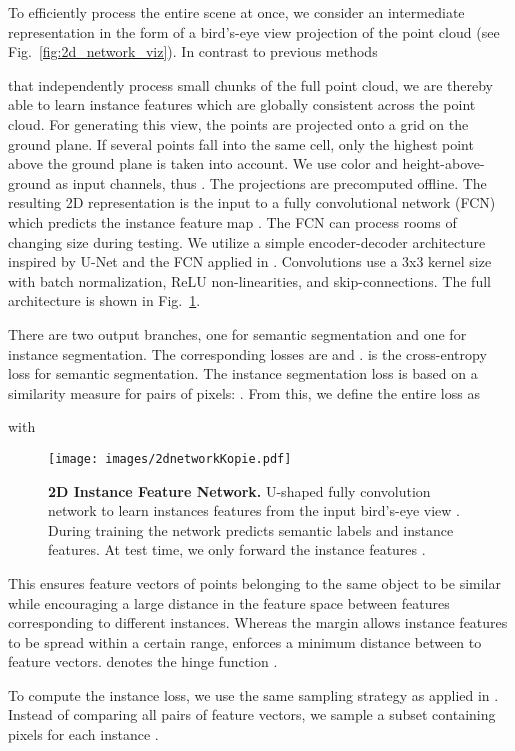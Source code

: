 \documentclass[runningheads]{llncs}
\newcommand{\reffig}[1]{Fig.~\ref{fig:#1}}
\begin{document}
To efficiently process the entire scene at once, we consider an intermediate representation  in the form of a bird's-eye view projection of the point cloud  (see \reffig{2d_network_viz}).
In contrast to previous methods {\cite{Wang18CVPR} that independently process small chunks of the full point cloud, we are thereby able to learn instance features which are globally consistent across the point cloud. For generating this view, the points are projected onto a grid on the ground plane. If several points fall into the same cell, only the highest point above the ground plane is taken into account. 
We use color and height-above-ground as input channels, thus .
The projections  are precomputed offline.
The resulting 2D representation is the input to a fully convolutional network (FCN)\,\cite{Shelhamer17PAMI} which predicts the instance feature map .
The FCN can process rooms of changing size during testing.
We utilize a simple encoder-decoder architecture inspired by U-Net \cite{Ronneberger15MICCAI} and the FCN applied in \cite{Hsu18IJCNN}.
Convolutions use a 3x3 kernel size with batch normalization, ReLU non-linearities, and skip-connections.
The full architecture is shown in \reffig{2d_network}.

There are two output branches, one for semantic segmentation and one for instance segmentation.
The corresponding losses are  and .
 is the cross-entropy loss for semantic segmentation.
The instance segmentation loss  is based on
a similarity measure for pairs of pixels:
.
From this, we define the entire loss as 

with


\begin{figure}[t]
	\centering
	\texttt{[image: images/2dnetworkKopie.pdf]}
	\caption{\textbf{2D Instance Feature Network.} U-shaped fully convolution network to learn instances features  from the input bird's-eye view .
	During training the network predicts semantic labels and instance features.
	At test time, we only forward the instance features .}
	\label{fig:2d_network}
\end{figure}

This ensures feature vectors of points belonging to the same object to be similar while encouraging a large distance in the feature space between features corresponding to different instances. 
Whereas the margin  allows instance features to be spread within a certain range,  enforces a minimum distance between to feature vectors.
 denotes the hinge function .

To compute the instance loss, we use the same sampling strategy as applied in \cite{Fathi17CoRR,Newell17NIPS}. Instead of comparing all pairs of feature vectors, we sample a subset  containing  pixels for each instance .



}
\end{document}
